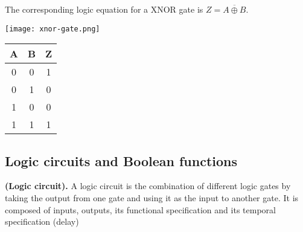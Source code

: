 The corresponding logic equation for a XNOR gate is $Z = \overline{A\oplus B}$.

\begin{minipage}{\textwidth}
\vspace{1cm}
\begin{minipage}[c]{0.49\textwidth}
    \centering
    \texttt{[image: xnor-gate.png]}
\end{minipage}
\hfill
\begin{minipage}[c]{.49\textwidth}
    \centering
    \begin{tabular}{ |c|c|c| } \hline 
        \textbf{A} & \textbf{B} & \textbf{Z} \\ \hline
        0 & 0 & 1 \\
        0 & 1 & 0 \\
        1 & 0 & 0 \\
        1 & 1 & 1 \\ 
        \hline
    \end{tabular}
\end{minipage}
\end{minipage}


\subsection{Logic circuits and Boolean functions}
\begin{definition}
    \textbf{(Logic circuit).} A logic circuit is the combination of different logic gates by taking the output from one gate and using it as the input to another gate. It is composed of inputs, outputs, its functional specification and its temporal specification (delay)
\end{definition}

